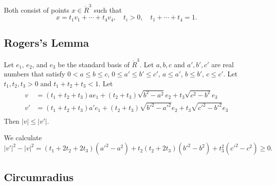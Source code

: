 \begin{tarskidata}
\begin{tarski}
\begin{proved}  Both consist of points $x\in\ring{R}^3$ such that
  $$x = t_1 v_1 +\cdots+ t_4 v_4,\quad t_i> 0,\quad t_1+\cdots +t_4 =1.
  $$
\swallowed\end{proved}
\end{tarski}






\begin{tarski}
\section{Rogers's Lemma}

\begin{lemma}
Let $e_1$, $e_2$, and $e_3$ be the standard basis of
$\ring{R}^3$.  Let  $a,b,c$ and $a',b',c'$
are real numbers that satisfy $0 <a \le b \le c$, $0 \le a'\le b'\le c'$,
$a \le a'$, $b \le b'$, $c \le c'$. 
Let $t_1,t_2,t_3>0$ and $t_1+t_2+t_3< 1$.  Let
   $$
   \begin{array}{lll}
   v &= (t_1+t_2+t_3) a e_1 + (t_2+t_3) \sqrt{b^2-a^2} e_2 + t_3
   \sqrt{c^2-b^2} e_3\\
   v' &= (t_1+t_2+t_3) a' e_1 + (t_2+t_3) \sqrt{b'^2-a'^2} e_2 + t_3
   \sqrt{c'^2-b'^2} e_3\\
    \end{array}
    $$
    Then $|v| \le |v'|$.
\end{lemma}

\begin{proved}
  We calculate
  $$
  |v'|^2-|v|^2 = (t_1+2t_2+2t_3)(a'^2-a^2) + t_2 (t_2+2t_3)(b'^2-b^2)
    +t_3^2 (c'^2-c^2)\ge0.
  $$
\swallowed\end{proved}
\end{tarski}






\begin{tarski}
\section{Circumradius}


\end{tarski}
\end{tarskidata}
